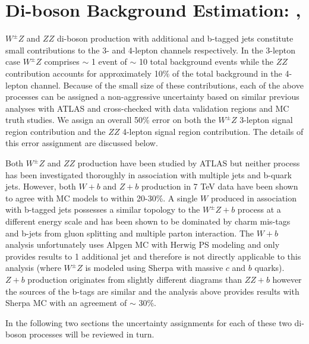 \section{Di-boson Background Estimation: \WZ,\ZZ }

$W^{\pm}Z$ and $ZZ$ di-boson production with additional and b-tagged jets constitute small contributions to 
the 3- and 4-lepton channels respectively. In the 3-lepton case $W^{\pm}Z$ comprises $\sim$ 1 event of $\sim$ 10 
total background events while the $ZZ$ contribution accounts for approximately 10\% of the total background in the 
4-lepton channel. Because of the small size of these contributions, each of the above processes can be assigned a 
non-aggressive uncertainty based on similar previous analyses with ATLAS and cross-checked with data validation 
regions and MC truth studies. We assign an overall 50\% error on both the $W^{\pm}Z$ 3-lepton signal region 
contribution and the $ZZ$ 4-lepton signal region contribution. The details of this error assignment are discussed below.
 
Both $W^{\pm}Z$ and $ZZ$ production have been studied by ATLAS \cite{WZAtlas}\cite{ZZAtlas} but neither process
has been investigated thoroughly in association with multiple jets and b-quark jets. However, both $W+b$ \cite{WbAtlas} 
and $Z+b$ \cite{ZbAtlas} production in 7 TeV data have been shown to agree with MC models to within 20-30\%. 
A single $W$ produced in association with b-tagged jets possesses a similar topology to the $W^{\pm}Z+b$ 
process at a different energy scale and has been shown to be dominated by charm mis-tags and b-jets from gluon splitting 
and multiple parton interaction. The $W+b$ analysis unfortunately uses Alpgen MC with Herwig PS modeling and only provides
results to 1 additional jet and therefore is not directly applicable to this \tth analysis (where $W^{\pm}Z$ is modeled 
using Sherpa with massive $c$ and $b$ quarks). $Z+b$ production originates from slightly different diagrams than $ZZ+b$ 
however the sources of the b-tags are similar and the analysis above provides results with Sherpa MC with an agreement 
of $\sim$ 30\%.
 
In the following two sections the uncertainty assignments for each of these two di-boson processes will be reviewed in turn. 

